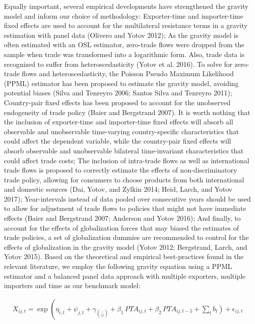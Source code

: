 \documentclass[12pt]{article}%
\begin{document}
Equally important, several empirical developments have strengthened the
gravity model and inform our choice of methodology: Exporter-time and
importer-time fixed effects are used to account for the multilateral
resistance terms in a gravity estimation with panel data (Olivero and
Yotov 2012); As the gravity model is often estimated with an OSL
estimator, zero-trade flows were dropped from the sample when trade was
transformed into a logarithmic form. Also, trade data is recognized to
suffer from heteroscedasticity (Yotov et al. 2016). To solve for
zero-trade flows and heteroscedasticity, the Poisson Pseudo Maximum
Likelihood (PPML) estimator has been proposed to estimate the gravity
model, avoiding potential biases (Silva and Tenreyro 2006; Santos Silva
and Tenreyro 2011); Country-pair fixed effects has been proposed to
account for the unobserved endogeneity of trade policy (Baier and
Bergstrand 2007). It is worth nothing that the inclusion of
exporter-time and importer-time fixed effects will absorb all observable
and unobservable time-varying country-specific characteristics that
could affect the dependent variable, while the country-pair fixed
effects will absorb observable and unobservable bilateral time-invariant
characteristics that could affect trade costs; The inclusion of
intra-trade flows as well as international trade flows is proposed to
correctly estimate the effects of non-discriminatory trade policy,
allowing for consumers to choose products from both international and
domestic sources (Dai, Yotov, and Zylkin 2014; Heid, Larch, and Yotov
2017); Year-intervals instead of data pooled over consecutive years
should be used to allow for adjustment of trade flows to policies that
might not have immediate effects (Baier and Bergstrand 2007; Anderson
and Yotov 2016); And finally, to account for the effects of
globalization forces that may biased the estimates of trade policies, a
set of globalization dummies are recommended to control for the effects
of globalization in the gravity model (Yotov 2012; Bergstrand, Larch,
and Yotov 2015). Based on the theoretical and empirical best-practices
found in the relevant literature, we employ the following gravity
equation using a PPML estimator and a balanced panel data approach with
multiple exporters, multiple importers and time as our benchmark model:

\begin{multline}
    X_{ij,t} = \exp\left(\eta_{i,t} + \psi_{j,t} + \gamma_{\binom{-}{ij}} + \beta_{1} \, PTA_{ij,t} \right. + \beta_{2} \, PTA_{ij,t-5} + \left. \sum_{t} b_{t} \right) + \epsilon_{ij,t}
\end{multline}
\end{document}
